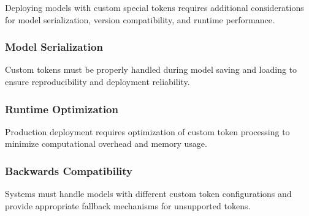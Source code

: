 Deploying models with custom special tokens requires additional considerations for model serialization, version compatibility, and runtime performance.

\subsubsection{Model Serialization}

Custom tokens must be properly handled during model saving and loading to ensure reproducibility and deployment reliability.
\begin{comment}
Feedback: This can be made more concrete. "When saving a model with custom tokens, ensure that the tokenizer's vocabulary file is saved along with the model weights. The `transformers` library's `save_pretrained` method typically handles this automatically, but it's a common source of errors when using custom tokenizers."
\end{comment}

\subsubsection{Runtime Optimization}

Production deployment requires optimization of custom token processing to minimize computational overhead and memory usage.

\subsubsection{Backwards Compatibility}

Systems must handle models with different custom token configurations and provide appropriate fallback mechanisms for unsupported tokens.
\begin{comment}
Feedback: A practical example would be useful. "If you deploy a new version of a model that uses a new custom token, older versions of your inference service might not recognize it. A robust system should have a fallback mechanism, such as treating the unknown custom token as a standard [UNK] token, to prevent crashes, even if performance is degraded."
\end{comment}
